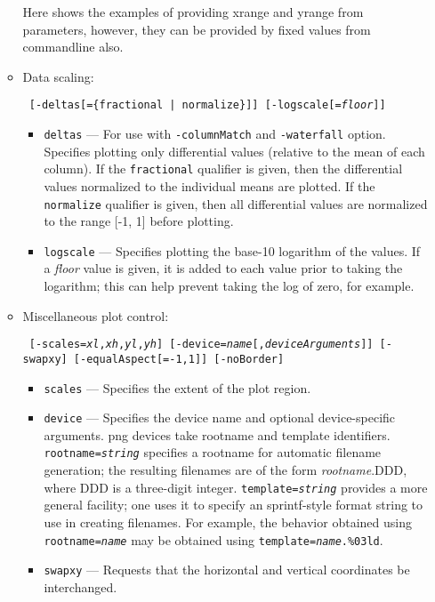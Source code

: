 \begin{itemize}
\begin{itemize}
       Here shows the examples of providing xrange and yrange from parameters, however, they can be provided by fixed values from commandline also.

    \item Data scaling:
\begin{flushleft}{\tt
[-deltas[=\{fractional | normalize\}]] [-logscale[={\em floor}]]
}\end{flushleft}
        \begin{itemize}
        \item \verb|deltas| --- For use with \verb|-columnMatch| and \verb|-waterfall| option.  Specifies plotting 
        only differential values (relative to the mean of each column).  If the \verb|fractional| 
        qualifier is given, then the differential values normalized to the individual
        means are plotted.  If the \verb|normalize| qualifier is given, then all differential values
        are normalized to the range [-1, 1] before plotting.
        \item \verb|logscale| --- Specifies plotting the base-10 logarithm of the values.  If a
        {\em floor} value is given, it is added to each value prior to taking the logarithm; this
        can help prevent taking the log of zero, for example.
        \end{itemize}
    \item Miscellaneous plot control:
\begin{flushleft}{\tt
[-scales={\em xl},{\em xh},{\em yl},{\em yh}] 
[-device={\em name}[,{\em deviceArguments}]] [-swapxy] [-equalAspect[={-1,1}]]
[-noBorder] 
}\end{flushleft}
        \begin{itemize}
        \item \verb|scales| --- Specifies the extent of the plot region.
        \item \verb|device| --- Specifies the device name and optional device-specific arguments. png devices
        take rootname and template identifiers. {\tt rootname={\em string}} specifies a rootname
        for automatic filename generation; the resulting filenames are of the form {\em rootname}.DDD, where DDD 
        is a three-digit integer. {\tt template={\em string}} provides a more general facility; one uses it to
        specify an sprintf-style format string to use in creating filenames. For example, the behavior obtained
        using {\tt rootname={\em name}} may be obtained  using {\tt template={\em name}.\%03ld}.
        \item \verb|swapxy| --- Requests that the horizontal and vertical coordinates be interchanged.

\end{itemize}
\end{itemize}
\end{itemize}
